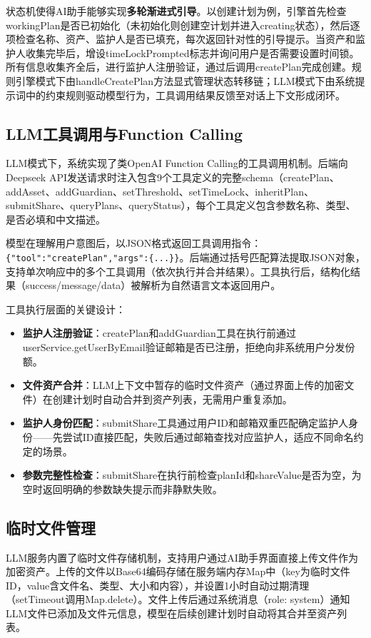\documentclass[UTF8,a4paper,zihao=-4,openany]{ctexrep}
\begin{document}
状态机使得AI助手能够实现\textbf{多轮渐进式引导}。以创建计划为例，引擎首先检查workingPlan是否已初始化（未初始化则创建空计划并进入creating状态），然后逐项检查名称、资产、监护人是否已填充，每次返回针对性的引导提示。当资产和监护人收集完毕后，增设timeLockPrompted标志并询问用户是否需要设置时间锁。所有信息收集齐全后，进行监护人注册验证，通过后调用createPlan完成创建。规则引擎模式下由handleCreatePlan方法显式管理状态转移链；LLM模式下由系统提示词中的约束规则驱动模型行为，工具调用结果反馈至对话上下文形成闭环。

\subsection{LLM工具调用与Function Calling}

LLM模式下，系统实现了类OpenAI Function Calling的工具调用机制。后端向Deepseek API发送请求时注入包含9个工具定义的完整schema（createPlan、addAsset、addGuardian、setThreshold、setTimeLock、inheritPlan、submitShare、queryPlans、queryStatus），每个工具定义包含参数名称、类型、是否必填和中文描述。

模型在理解用户意图后，以JSON格式返回工具调用指令：\texttt{\{"tool":"createPlan","args":\{...\}\}}。后端通过括号匹配算法提取JSON对象，支持单次响应中的多个工具调用（依次执行并合并结果）。工具执行后，结构化结果（success/message/data）被解析为自然语言文本返回用户。

工具执行层面的关键设计：
\begin{itemize}
\item \textbf{监护人注册验证}：createPlan和addGuardian工具在执行前通过userService.getUserByEmail验证邮箱是否已注册，拒绝向非系统用户分发份额。
\item \textbf{文件资产合并}：LLM上下文中暂存的临时文件资产（通过界面上传的加密文件）在创建计划时自动合并到资产列表，无需用户重复添加。
\item \textbf{监护人身份匹配}：submitShare工具通过用户ID和邮箱双重匹配确定监护人身份——先尝试ID直接匹配，失败后通过邮箱查找对应监护人，适应不同命名约定的场景。
\item \textbf{参数完整性检查}：submitShare在执行前检查planId和shareValue是否为空，为空时返回明确的参数缺失提示而非静默失败。
\end{itemize}

\subsection{临时文件管理}

LLM服务内置了临时文件存储机制，支持用户通过AI助手界面直接上传文件作为加密资产。上传的文件以Base64编码存储在服务端内存Map中（key为临时文件ID，value含文件名、类型、大小和内容），并设置1小时自动过期清理（setTimeout调用Map.delete）。文件上传后通过系统消息（role: system）通知LLM文件已添加及文件元信息，模型在后续创建计划时自动将其合并至资产列表。
\end{document}
